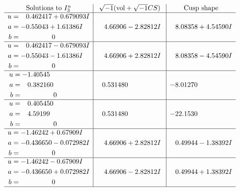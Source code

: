 \documentclass[1p]{elsarticle_modified}
\theoremstyle{definition}
\newcommand{\I}{\sqrt{-1}}
\begin{document}
$$\begin{array}{c|c|c}  
\text{Solutions to }I^u_{3}& \I (\text{vol} + \sqrt{-1}CS) & \text{Cusp shape}\\
 \hline 
\begin{aligned}
u &= \phantom{-}0.462417 + 0.679093 I \\
a &= -0.55043 + 1.61386 I \\
b &= \phantom{-0.000000 } 0\end{aligned}
 & \phantom{-}4.66906 - 2.82812 I & \phantom{-}8.08358 + 4.54590 I \\ \hline\begin{aligned}
u &= \phantom{-}0.462417 - 0.679093 I \\
a &= -0.55043 - 1.61386 I \\
b &= \phantom{-0.000000 } 0\end{aligned}
 & \phantom{-}4.66906 + 2.82812 I & \phantom{-}8.08358 - 4.54590 I \\ \hline\begin{aligned}
u &= -1.40545\phantom{ +0.000000I} \\
a &= \phantom{-}0.382160\phantom{ +0.000000I} \\
b &= \phantom{-0.000000 } 0\end{aligned}
 & \phantom{-}0.531480\phantom{ +0.000000I} & -8.01270\phantom{ +0.000000I} \\ \hline\begin{aligned}
u &= \phantom{-}0.405450\phantom{ +0.000000I} \\
a &= \phantom{-}4.59199\phantom{ +0.000000I} \\
b &= \phantom{-0.000000 } 0\end{aligned}
 & \phantom{-}0.531480\phantom{ +0.000000I} & -22.1530\phantom{ +0.000000I} \\ \hline\begin{aligned}
u &= -1.46242 + 0.67909 I \\
a &= -0.436650 - 0.072982 I \\
b &= \phantom{-0.000000 } 0\end{aligned}
 & \phantom{-}4.66906 + 2.82812 I & \phantom{-}0.49944 - 1.38392 I \\ \hline\begin{aligned}
u &= -1.46242 - 0.67909 I \\
a &= -0.436650 + 0.072982 I \\
b &= \phantom{-0.000000 } 0\end{aligned}
 & \phantom{-}4.66906 - 2.82812 I & \phantom{-}0.49944 + 1.38392 I\\
 \hline 
 \end{array}$$\newpage
\end{document}
